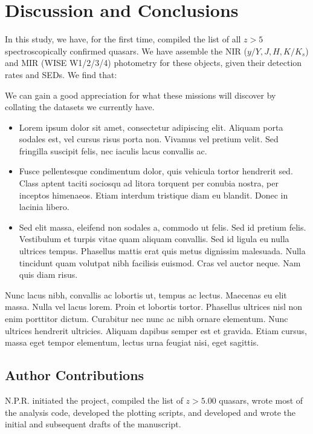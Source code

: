 \documentclass[usenatbib]{mnras}
\begin{document}
\section{Discussion and Conclusions}
\label{sec:conclusions}
In this study, we have, for the first time, compiled the list of all
$z>5$ spectroscopically confirmed quasars. We have assemble the NIR
($y/Y, J, H, K/K_{s}$) and MIR (WISE W1/2/3/4) photometry for these
objects, given their detection rates and SEDs. We find that: 

We can gain a good appreciation for what these missions will discover
by collating the datasets we currently have. 

\begin{itemize}
    \item Lorem ipsum dolor sit amet, consectetur adipiscing
      elit. Aliquam porta sodales est, vel cursus risus porta non. Vivamus
      vel pretium velit. Sed fringilla suscipit felis, nec iaculis lacus
      convallis ac. 
    \item Fusce pellentesque condimentum dolor, quis vehicula
      tortor hendrerit sed. Class aptent taciti sociosqu ad litora torquent
      per conubia nostra, per inceptos himenaeos. Etiam interdum tristique
      diam eu blandit. Donec in lacinia libero.
    \item Sed elit massa, eleifend non sodales a, commodo ut felis. Sed id
      pretium felis. Vestibulum et turpis vitae quam aliquam convallis. Sed
      id ligula eu nulla ultrices tempus. Phasellus mattis erat quis metus
      dignissim malesuada. Nulla tincidunt quam volutpat nibh facilisis
      euismod. Cras vel auctor neque. Nam quis diam risus.
\end{itemize}
Nunc lacus nibh, convallis ac lobortis ut, tempus ac lectus. Maecenas
eu elit massa. Nulla vel lacus lorem. Proin et lobortis
tortor. Phasellus ultrices nisl non enim porttitor dictum. Curabitur
nec nunc ac nibh ornare elementum. Nunc ultrices hendrerit
ultricies. Aliquam dapibus semper est et gravida. Etiam cursus, massa
eget tempor elementum, lectus urna feugiat nisi, eget sagittis.

\subsection*{Author Contributions}   
N.P.R. initiated the project, compiled the list of $z>5.00$ quasars, wrote most of the analysis code, developed the plotting scripts, and developed and wrote the initial and subsequent drafts of the manuscript.
\end{document}
